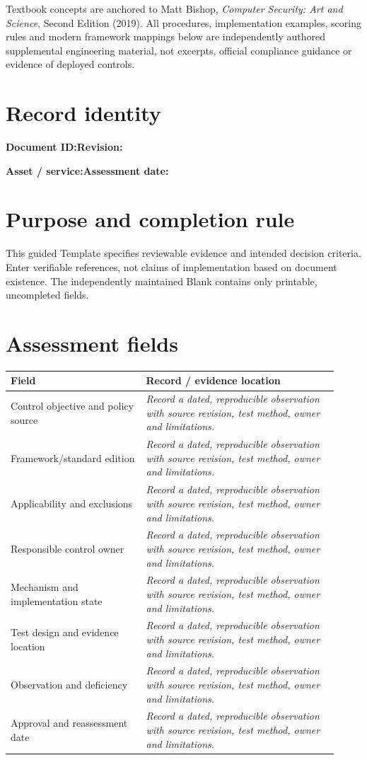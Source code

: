 \documentclass[10pt,letterpaper]{article}
\begin{document}
\makedoctocpage
\begin{notebox}
Textbook concepts are anchored to Matt Bishop, \emph{Computer Security: Art and Science}, Second Edition (2019). All procedures, implementation examples, scoring rules and modern framework mappings below are independently authored supplemental engineering material, not excerpts, official compliance guidance or evidence of deployed controls.
\end{notebox}
\section{Record identity}
\textbf{Document ID:}\enspace\hrulefill\quad\textbf{Revision:}\enspace\hrulefill
\par\medskip\textbf{Asset / service:}\enspace\hrulefill\quad\textbf{Assessment date:}\enspace\hrulefill
\section{Purpose and completion rule}
This guided Template specifies reviewable evidence and intended decision criteria. Enter verifiable references, not claims of implementation based on document existence. The independently maintained Blank contains only printable, uncompleted fields.
\section{Assessment fields}
\renewcommand{\arraystretch}{1.8}
\begin{longtable}{@{}p{0.38\linewidth}p{0.54\linewidth}@{}}
\toprule\textbf{Field}&\textbf{Record / evidence location}\\\midrule\endhead
Control objective and policy source & \emph{Record a dated, reproducible observation with source revision, test method, owner and limitations.}\\\midrule
Framework/standard edition & \emph{Record a dated, reproducible observation with source revision, test method, owner and limitations.}\\\midrule
Applicability and exclusions & \emph{Record a dated, reproducible observation with source revision, test method, owner and limitations.}\\\midrule
Responsible control owner & \emph{Record a dated, reproducible observation with source revision, test method, owner and limitations.}\\\midrule
Mechanism and implementation state & \emph{Record a dated, reproducible observation with source revision, test method, owner and limitations.}\\\midrule
Test design and evidence location & \emph{Record a dated, reproducible observation with source revision, test method, owner and limitations.}\\\midrule
Observation and deficiency & \emph{Record a dated, reproducible observation with source revision, test method, owner and limitations.}\\\midrule
Approval and reassessment date & \emph{Record a dated, reproducible observation with source revision, test method, owner and limitations.}\\\midrule
\bottomrule\end{longtable}
\end{document}
